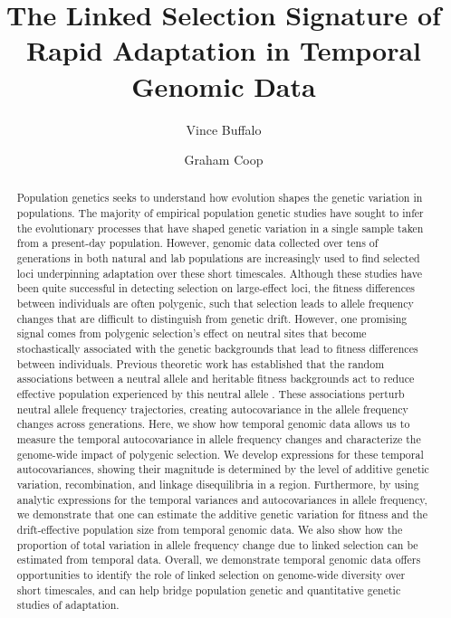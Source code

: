 \documentclass[11pt]{article}
\title{The Linked Selection Signature of Rapid Adaptation in Temporal Genomic Data}
\author[$\ast$,$\dag$,$1$]{Vince Buffalo}
\author[$\dag$]{Graham Coop}
\affil[$\ast$]{\footnotesize Population Biology Graduate Group}
\affil[$\dag$]{\footnotesize Center for Population Biology, Department of Evolution and Ecology, University of California, Davis, CA 95616}
\affil[$1$]{\footnotesize Email for correspondence: \href{mailto:vsbuffalo@ucdavis.edu}{vsbuffalo@ucdavis.edu}}
\begin{document}
\maketitle



\linenumbers
\begin{abstract}

  Population genetics seeks to understand how evolution shapes the genetic
  variation in populations. The majority of empirical population genetic
  studies have sought to infer the evolutionary processes that have shaped
  genetic variation in a single sample taken from a present-day population.
  However, genomic data collected over tens of generations in both natural and
  lab populations are increasingly used to find selected loci underpinning
  adaptation over these short timescales. Although these studies have been
  quite successful in detecting selection on large-effect loci, the fitness
  differences between individuals are often polygenic, such that selection
  leads to allele frequency changes that are difficult to distinguish from
  genetic drift. However, one promising signal comes from polygenic selection's
  effect on neutral sites that become stochastically associated with the
  genetic backgrounds that lead to fitness differences between individuals.
  Previous theoretic work has established that the random associations between
  a neutral allele and heritable fitness backgrounds act to reduce effective
  population experienced by this neutral allele
  \parencite{Santiago1995-hx,Santiago1998-bs}. These associations perturb
  neutral allele frequency trajectories, creating autocovariance in the allele
  frequency changes across generations. Here, we show how temporal genomic data
  allows us to measure the temporal autocovariance in allele frequency changes
  and characterize the genome-wide impact of polygenic selection. We develop
  expressions for these temporal autocovariances, showing their magnitude is
  determined by the level of additive genetic variation, recombination, and
  linkage disequilibria in a region. Furthermore, by using analytic expressions
  for the temporal variances and autocovariances in allele frequency, we
  demonstrate that one can estimate the additive genetic variation for fitness
  and the drift-effective population size from temporal genomic data. We also
  show how the proportion of total variation in allele frequency change due to
  linked selection can be estimated from temporal data. Overall, we demonstrate
  temporal genomic data offers opportunities to identify the role of linked
  selection on genome-wide diversity over short timescales, and can help bridge
  population genetic and quantitative genetic studies of adaptation.

 \end{abstract}
\end{document}
